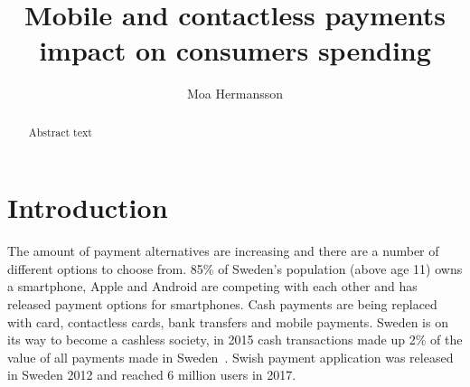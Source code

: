 \documentclass[runningheads,a4paper,oribibl]{llncs}
\begin{document}
\pagestyle{plain}

\mainmatter

\title{Mobile and contactless payments impact on consumers spending}
\author{Moa Hermansson}
\maketitle



%
%

 \begin{abstract}
 Abstract text
\end{abstract}


\section{Introduction}

The amount of payment alternatives are increasing and there are a number of different options to choose from. 85\% of Sweden's population (above age 11) owns a smartphone, Apple and Android are competing with each other and has released payment options for smartphones. Cash payments are being replaced with card, contactless cards, bank transfers and mobile payments. Sweden is on its way to become a cashless society, in 2015 cash transactions made up 2\% of the value of all payments made in Sweden~\cite{busarticleApplePay}.
Swish payment application was released in Sweden 2012 and reached 6 million users in 2017.
\end{document}
